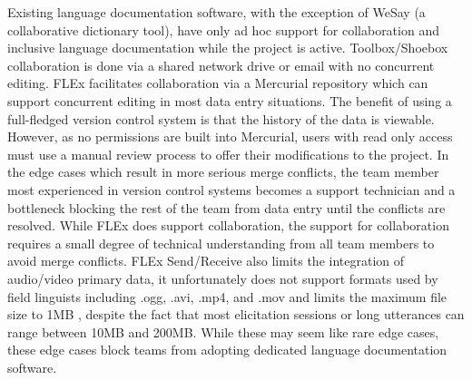 \documentclass[11pt]{article}
\newcommand{\smalltodo}[2][]
    {\todo[caption={#2}, #1]
    {\tiny#2\normalsize}}
\begin{document}
 

Existing language documentation software,  with the exception of WeSay (a
collaborative dictionary tool), have only ad hoc support for collaboration and
inclusive language documentation while the project is active. Toolbox/Shoebox
collaboration is done via a shared network drive or email with no concurrent
editing. FLEx  facilitates collaboration via a Mercurial repository
\cite{FLExSendReceive:2013:Online} which can  support concurrent 
editing in most data entry situations. The benefit of using a full-fledged
version control system is that the history of the data is viewable. 
However, as no permissions are built into Mercurial, users with read only
access must use a manual review process to offer their modifications to the
project. In the edge cases which result in more serious merge conflicts, the
team member most experienced in version control systems becomes a
support technician and a bottleneck blocking the rest of the team from data
entry until the conflicts are resolved.  While FLEx does support collaboration,
the support for collaboration requires a small degree of technical
understanding from all team members to avoid merge conflicts.  FLEx
Send/Receive also limits the integration of audio/video primary data, it
 unfortunately does not support formats used by field linguists including .ogg, .avi, .mp4, and .mov and limits the maximum file size to 1MB  \cite{FLExSendReceive:2013:Online}, despite the fact that most elicitation sessions or long utterances can range between 10MB and 200MB. While these may seem like rare edge cases, these edge cases block teams from adopting dedicated language documentation software.
\end{document}
